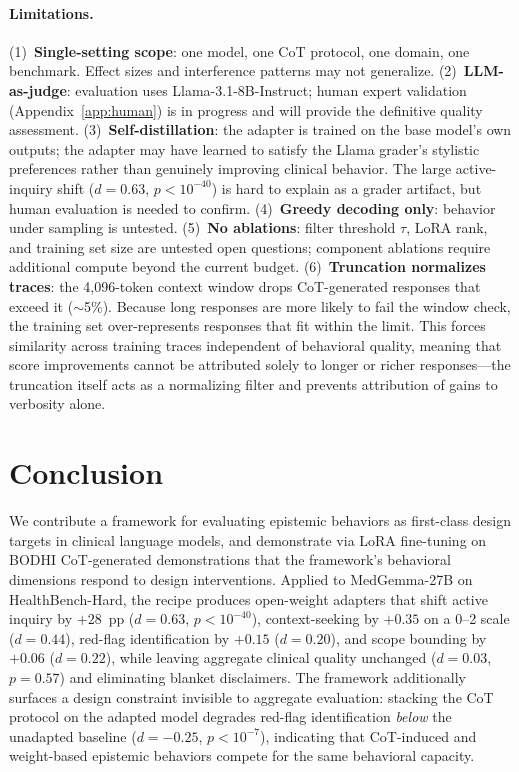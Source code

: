 \documentclass{article}
\newcommand{\bodhi}{BODHI}
\begin{document}
\paragraph{Limitations.} (1)~\textbf{Single-setting scope}: one model, one CoT protocol, one domain, one benchmark. Effect sizes and interference patterns may not generalize. (2)~\textbf{LLM-as-judge}: evaluation uses Llama-3.1-8B-Instruct; human expert validation (Appendix~\ref{app:human}) is in progress and will provide the definitive quality assessment. (3)~\textbf{Self-distillation}: the adapter is trained on the base model's own outputs; the adapter may have learned to satisfy the Llama grader's stylistic preferences rather than genuinely improving clinical behavior. The large active-inquiry shift ($d=0.63$, $p<10^{-40}$) is hard to explain as a grader artifact, but human evaluation is needed to confirm. (4)~\textbf{Greedy decoding only}: behavior under sampling is untested. (5)~\textbf{No ablations}: filter threshold $\tau$, LoRA rank, and training set size are untested open questions; component ablations require additional compute beyond the current budget. (6)~\textbf{Truncation normalizes traces}: the 4,096-token context window drops CoT-generated responses that exceed it ($\sim$5\%). Because long responses are more likely to fail the window check, the training set over-represents responses that fit within the limit. This forces similarity across training traces independent of behavioral quality, meaning that score improvements cannot be attributed solely to longer or richer responses---the truncation itself acts as a normalizing filter and prevents attribution of gains to verbosity alone.

\section{Conclusion}
\label{sec:conclusion}

We contribute a framework for evaluating epistemic behaviors as first-class design targets in clinical language models, and demonstrate via LoRA fine-tuning on \bodhi{} CoT-generated demonstrations that the framework's behavioral dimensions respond to design interventions. Applied to MedGemma-27B on HealthBench-Hard, the recipe produces open-weight adapters that shift active inquiry by $+28$~pp ($d=0.63$, $p<10^{-40}$), context-seeking by $+0.35$ on a 0--2 scale ($d=0.44$), red-flag identification by $+0.15$ ($d=0.20$), and scope bounding by $+0.06$ ($d=0.22$), while leaving aggregate clinical quality unchanged ($d=0.03$, $p=0.57$) and eliminating blanket disclaimers. The framework additionally surfaces a design constraint invisible to aggregate evaluation: stacking the CoT protocol on the adapted model degrades red-flag identification \emph{below} the unadapted baseline ($d=-0.25$, $p<10^{-7}$), indicating that CoT-induced and weight-based epistemic behaviors compete for the same behavioral capacity.
\end{document}
